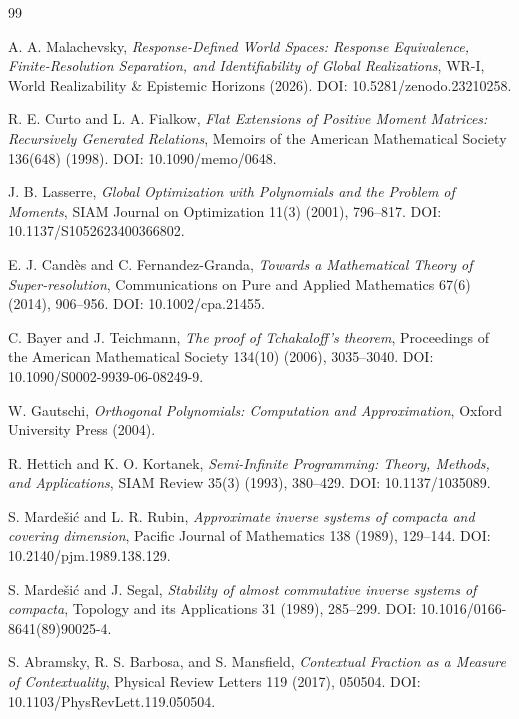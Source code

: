 \documentclass[11pt]{article}
\begin{document}
\begin{thebibliography}{99}

A. A. Malachevsky,
\emph{Response-Defined World Spaces: Response Equivalence,
Finite-Resolution Separation, and Identifiability of Global Realizations},
WR-I, World Realizability \& Epistemic Horizons (2026).
DOI: 10.5281/zenodo.23210258.




R. E. Curto and L. A. Fialkow,
\emph{Flat Extensions of Positive Moment Matrices: Recursively Generated Relations},
Memoirs of the American Mathematical Society 136(648) (1998).
DOI: 10.1090/memo/0648.

J. B. Lasserre,
\emph{Global Optimization with Polynomials and the Problem of Moments},
SIAM Journal on Optimization 11(3) (2001), 796--817.
DOI: 10.1137/S1052623400366802.

E. J. Cand\`es and C. Fernandez-Granda,
\emph{Towards a Mathematical Theory of Super-resolution},
Communications on Pure and Applied Mathematics 67(6) (2014), 906--956.
DOI: 10.1002/cpa.21455.

C. Bayer and J. Teichmann,
\emph{The proof of Tchakaloff's theorem},
Proceedings of the American Mathematical Society 134(10) (2006), 3035--3040.
DOI: 10.1090/S0002-9939-06-08249-9.

W. Gautschi,
\emph{Orthogonal Polynomials: Computation and Approximation},
Oxford University Press (2004).

R. Hettich and K. O. Kortanek,
\emph{Semi-Infinite Programming: Theory, Methods, and Applications},
SIAM Review 35(3) (1993), 380--429.
DOI: 10.1137/1035089.

S. Marde\v{s}i\'c and L. R. Rubin,
\emph{Approximate inverse systems of compacta and covering dimension},
Pacific Journal of Mathematics 138 (1989), 129--144.
DOI: 10.2140/pjm.1989.138.129.

S. Marde\v{s}i\'c and J. Segal,
\emph{Stability of almost commutative inverse systems of compacta},
Topology and its Applications 31 (1989), 285--299.
DOI: 10.1016/0166-8641(89)90025-4.

S. Abramsky, R. S. Barbosa, and S. Mansfield,
\emph{Contextual Fraction as a Measure of Contextuality},
Physical Review Letters 119 (2017), 050504.
DOI: 10.1103/PhysRevLett.119.050504.


\end{thebibliography}
\end{document}
